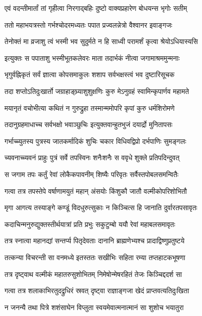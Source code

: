\twolineshloka
{एवं वदन्तीमार्तां तां गृहीत्वा निरगाद्बहिः}
{दुष्टो वाक्यप्रहारेण बोधयन्स भृगोः सतीम्}%

\twolineshloka
{ततो महाभयत्रस्तो गर्भश्चोदरमध्यतः}
{पपात प्रज्वलन्नेत्रो वैश्वानर इवाङ्गजः}%

\twolineshloka
{तेनोक्तं मा व्रजाशु त्वं भस्मी भव सुदुर्मते}
{न हि साध्वी परामर्शं कृत्वा श्रेयोऽधियास्यसि}%

\twolineshloka
{इत्युक्तः स पपाताशु भस्मीभूतकलेवरः}
{माता तदार्भकं नीत्वा जगामाश्रममुन्मनाः}%

\twolineshloka
{भृगुर्वह्निकृतं सर्वं ज्ञात्वा कोपसमाकुलः}
{शशाप सर्वभक्षस्त्वं भव दुष्टारिसूचक}%

\twolineshloka
{तदा शप्तोऽतिदुःखार्तो जग्राहाङ्घ्र्याशुशुक्षणिः}
{कुरु मेऽनुग्रहं स्वामिन्कृपार्णव महामते}%

\twolineshloka
{मयानृतं वचोभीत्या कथितं न गुरुद्रुहा}
{तस्मान्ममोपरि कृपां कुरु धर्मशिरोमणे}%

\twolineshloka
{तदानुग्रहमाधाच्च सर्वभक्षो भवाञ्छुचिः}
{इत्युक्तवान्हुतभुजं दयार्द्रो मुनितापसः}%

\twolineshloka
{गर्भाच्च्युतस्य पुत्रस्य जातकर्मादिकं शुचिः}
{चकार विधिवद्विप्रो दर्भपाणिः सुमङ्गलः}%

\twolineshloka
{च्यवनाच्च्यवनं प्राहुः पुत्रं सर्वे तपस्विनः}
{शनैःशनैः स ववृधे शुक्ले प्रतिपदिन्दुवत्}%

\twolineshloka
{स जगाम तपः कर्तुं रेवां लोकैकपावनीम्}
{शिष्यैः परिवृतः सर्वैस्तपोबलसमन्वितैः}%

\twolineshloka
{गत्वा तत्र तपस्तेपे वर्षाणामयुतं महान्}
{अंसयोः किंशुकौ जातौ वल्मीकोपरिशोभितौ}%

\twolineshloka
{मृगा आगत्य तस्याङ्गे कण्डूं विदधुरुत्सुकाः}
{न किञ्चित्स हि जानाति दुर्वारतपसावृतः}%

\twolineshloka
{कदाचिन्मनुरुद्युक्तस्तीर्थयात्रां प्रति प्रभुः}
{सकुटुम्बो ययौ रेवां महाबलसमावृतः}%

\twolineshloka
{तत्र स्नात्वा महानद्यां सन्तर्प्य पितृदेवताः}
{दानानि ब्राह्मणेभ्यश्च प्रादाद्विष्णुप्रतुष्टये}%

\twolineshloka
{तत्कन्या विचरन्ती सा वनमध्ये इतस्ततः}
{सखीभिः सहिता रम्या तप्तहाटकभूषणा}%

\twolineshloka
{तत्र दृष्ट्वाथ वल्मीकं महातरुसुशोभितम्}
{निमेषोन्मेषरहितं तेजः किञ्चिद्ददर्श सा}%

\twolineshloka
{गत्वा तत्र शलाकाभिरतुदद्रुधिरं स्रवत्}
{दृष्ट्वा राज्ञाङ्गजा खेदं प्राप्तवत्यतिदुःखिता}%

\twolineshloka
{न जनन्यै तथा पित्रे शशंसाघेन विप्लुता}
{स्वयमेवात्मनात्मानं सा शुशोच भयातुरा}%

